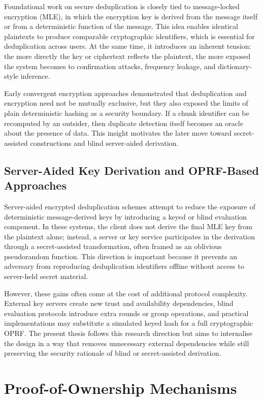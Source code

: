 \documentclass[12pt,a4paper,oneside]{report}
\begin{document}
Foundational work on secure deduplication is closely tied to message-locked encryption (MLE), in which the encryption key is derived from the message itself or from a deterministic function of the message.
This idea enables identical plaintexts to produce comparable cryptographic identifiers, which is essential for deduplication across users.
At the same time, it introduces an inherent tension: the more directly the key or ciphertext reflects the plaintext, the more exposed the system becomes to confirmation attacks, frequency leakage, and dictionary-style inference.

Early convergent encryption approaches demonstrated that deduplication and encryption need not be mutually exclusive, but they also exposed the limits of plain deterministic hashing as a security boundary.
If a chunk identifier can be recomputed by an outsider, then duplicate detection itself becomes an oracle about the presence of data.
This insight motivates the later move toward secret-assisted constructions and blind server-aided derivation.

\subsection{Server-Aided Key Derivation and OPRF-Based Approaches}

Server-aided encrypted deduplication schemes attempt to reduce the exposure of deterministic message-derived keys by introducing a keyed or blind evaluation component.
In these systems, the client does not derive the final MLE key from the plaintext alone; instead, a server or key service participates in the derivation through a secret-assisted transformation, often framed as an oblivious pseudorandom function.
This direction is important because it prevents an adversary from reproducing deduplication identifiers offline without access to server-held secret material.

However, these gains often come at the cost of additional protocol complexity.
External key servers create new trust and availability dependencies, blind evaluation protocols introduce extra rounds or group operations, and practical implementations may substitute a simulated keyed hash for a full cryptographic OPRF.
The present thesis follows this research direction but aims to internalise the design in a way that removes unnecessary external dependencies while still preserving the security rationale of blind or secret-assisted derivation.

\section{Proof-of-Ownership Mechanisms}
\end{document}
